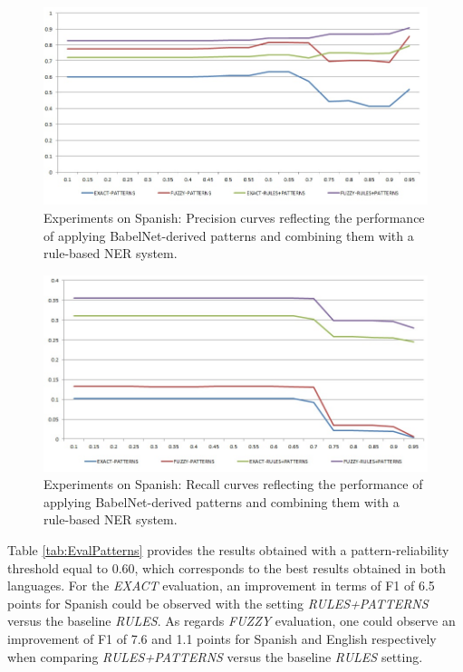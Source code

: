 \documentclass[output=paper]{langsci/langscibook}
\begin{document}
\begin{figure}
\centering
\includegraphics[width=.95\textwidth]{figures/eval_patterns_Spanish_precision.jpg}
\caption{Experiments on Spanish: Precision curves reflecting the performance of applying BabelNet-derived patterns and combining them with a rule-based NER system.}
\label{fig:eval_patterns_spanish_precision}
\end{figure}

\begin{figure}
\centering
\includegraphics[width=.95\textwidth]{figures/eval_patterns_Spanish_recall.jpg}
\caption{Experiments on Spanish: Recall curves reflecting the performance of applying BabelNet-derived patterns and combining them with a rule-based NER system.}
\label{fig:eval_patterns_spanish_recall}
\end{figure}
        
Table \ref{tab:EvalPatterns} provides the results obtained with a pattern-reliability threshold equal to 0.60, which corresponds to the best results obtained in both languages. For the \textit{EXACT} evaluation, an improvement in terms of F1 of 6.5 points for Spanish could be observed with the setting \textit{RULES+PATTERNS} versus the baseline \textit{RULES}. As regards \textit{FUZZY} evaluation, one could observe an improvement of F1 of 7.6 and 1.1 points for Spanish and English respectively when comparing \textit{RULES+PATTERNS} versus the baseline \textit{RULES} setting.
\end{document}
